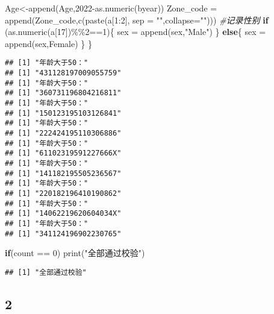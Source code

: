 \documentclass[
]{article}
\newenvironment{Shaded}{\begin{snugshade}}{\end{snugshade}}
\newcommand{\AttributeTok}[1]{\textcolor[rgb]{0.77,0.63,0.00}{#1}}
\newcommand{\CommentTok}[1]{\textcolor[rgb]{0.56,0.35,0.01}{\textit{#1}}}
\newcommand{\ControlFlowTok}[1]{\textcolor[rgb]{0.13,0.29,0.53}{\textbf{#1}}}
\newcommand{\DecValTok}[1]{\textcolor[rgb]{0.00,0.00,0.81}{#1}}
\newcommand{\FunctionTok}[1]{\textcolor[rgb]{0.00,0.00,0.00}{#1}}
\newcommand{\NormalTok}[1]{#1}
\newcommand{\OtherTok}[1]{\textcolor[rgb]{0.56,0.35,0.01}{#1}}
\newcommand{\SpecialCharTok}[1]{\textcolor[rgb]{0.00,0.00,0.00}{#1}}
\newcommand{\StringTok}[1]{\textcolor[rgb]{0.31,0.60,0.02}{#1}}
\begin{document}
\begin{Shaded}
\begin{Highlighting}[]
\NormalTok{  Age}\OtherTok{\textless{}{-}}\FunctionTok{append}\NormalTok{(Age,}\DecValTok{2022}\SpecialCharTok{{-}}\FunctionTok{as.numeric}\NormalTok{(byear))}
\NormalTok{  Zone\_code }\OtherTok{=} \FunctionTok{append}\NormalTok{(Zone\_code,}\FunctionTok{c}\NormalTok{(}\FunctionTok{paste}\NormalTok{(a[}\DecValTok{1}\SpecialCharTok{:}\DecValTok{2}\NormalTok{], }\AttributeTok{sep =} \StringTok{""}\NormalTok{,}\AttributeTok{collapse=}\StringTok{""}\NormalTok{)))}
  \CommentTok{\#记录性别}
  \ControlFlowTok{if}\NormalTok{ (}\FunctionTok{as.numeric}\NormalTok{(a[}\DecValTok{17}\NormalTok{])}\SpecialCharTok{\%\%}\DecValTok{2}\SpecialCharTok{==}\DecValTok{1}\NormalTok{)\{}
\NormalTok{    sex }\OtherTok{=} \FunctionTok{append}\NormalTok{(sex,}\StringTok{"Male"}\NormalTok{)}
\NormalTok{  \}}
  \ControlFlowTok{else}\NormalTok{\{}
\NormalTok{    sex }\OtherTok{=} \FunctionTok{append}\NormalTok{(sex,}\StringTok{\textquotesingle{}Female\textquotesingle{}}\NormalTok{)}
\NormalTok{  \}}
\NormalTok{\}}
\end{Highlighting}
\end{Shaded}

\begin{verbatim}
## [1] "年龄大于50："
## [1] "431128197009055759"
## [1] "年龄大于50："
## [1] "360731196804216811"
## [1] "年龄大于50："
## [1] "150123195103126841"
## [1] "年龄大于50："
## [1] "222424195110306886"
## [1] "年龄大于50："
## [1] "61102319591227666X"
## [1] "年龄大于50："
## [1] "141182195505236567"
## [1] "年龄大于50："
## [1] "220182196410190862"
## [1] "年龄大于50："
## [1] "14062219620604034X"
## [1] "年龄大于50："
## [1] "341124196902230765"
\end{verbatim}

\begin{Shaded}
\begin{Highlighting}[]
\ControlFlowTok{if}\NormalTok{(count }\SpecialCharTok{==} \DecValTok{0}\NormalTok{) }\FunctionTok{print}\NormalTok{(}\StringTok{"全部通过校验"}\NormalTok{)}
\end{Highlighting}
\end{Shaded}

\begin{verbatim}
## [1] "全部通过校验"
\end{verbatim}

\hypertarget{section-3}{%
\subsection{2}\label{section-3}}
\end{document}
